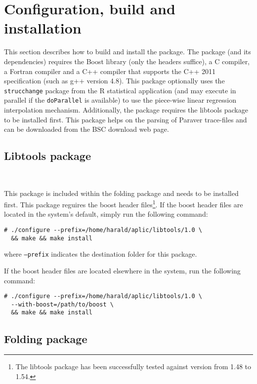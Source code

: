 \section{Configuration, build and installation}

This section describes how to build and install the \FOLDING package.
The \FOLDING package (and its dependencies) requires the Boost library (only the headers suffice), a C compiler, a Fortran compiler and a C++ compiler that supports the C++ 2011 specification (such as g++ version 4.8).
This package optionally uses the \texttt{strucchange} package from the R statistical application (and may execute in parallel if the \texttt{doParallel} is available) to use the piece-wise linear regression interpolation mechanism.
Additionally, the \FOLDING package requires the libtools package to be installed first.
This package helps on the parsing of Paraver trace-files and can be downloaded from the BSC download web page.

\subsection{Libtools package}~\label{subsec:LibtoolsInstallation}

This package is included within the folding package and needs to be installed first.
This package reguires the boost header files\footnote{The libtools package has been successfully tested against version from 1.48 to 1.54.}.
If the boost header files are located in the system's default, simply run the following command:

\begin{verbatim}
# ./configure --prefix=/home/harald/aplic/libtools/1.0 \
  && make && make install
\end{verbatim}

where \texttt{--prefix} indicates the destination folder for this package.

If the boost header files are located elsewhere in the system, run the following command:

\begin{verbatim}
# ./configure --prefix=/home/harald/aplic/libtools/1.0 \
  --with-boost=/path/to/boost \
  && make && make install
\end{verbatim}

\subsection{Folding package}

